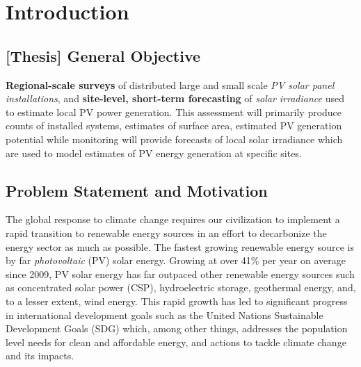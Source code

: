 \section{Introduction}



\subsection{[Thesis] General Objective}
    \textbf{Regional-scale surveys} of distributed large and small scale \textit{PV solar panel installations}, and \textbf{site-level, short-term forecasting} of \textit{solar irradiance} used to estimate local PV power generation.
    This assessment will primarily produce counts of installed systems, estimates of surface area, estimated PV generation potential while monitoring will provide forecasts of local solar irradiance which are used to model estimates of PV energy generation at specific sites.

\subsection{Problem Statement and Motivation} 
The global response to climate change requires our civilization to implement a rapid transition to renewable energy sources in an effort to 
decarbonize the energy sector as much as possible. The fastest growing renewable energy source is by far \textit{photovoltaic} (PV) solar energy. Growing at over 41\% per year on average since 2009\cite{kruitwagen_global_inventory_pv_units_2021},
PV solar energy has far outpaced other renewable energy sources such as concentrated solar power (CSP), hydroelectric storage, geothermal energy, and, to a lesser extent, wind energy. 
This rapid growth has led to significant progress in international development goals such as the United Nations Sustainable Development Goals (SDG) which, among other things, 
addresses the population level needs for clean and affordable energy, and actions to tackle climate change and its impacts\cite{maxar_germany_pv_dataset}. 

